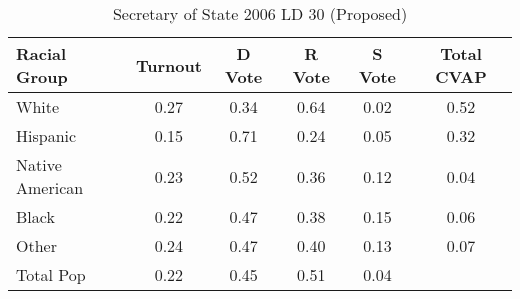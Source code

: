 \begin{table}[htb]
\begin{center}
\caption{Secretary of State 2006 LD 30 (Proposed)}
\label{sos06_cvap_ld_30}
\begin{tabular}{lccccc}
  \hline
Racial Group & Turnout & D Vote & R Vote & S Vote & Total CVAP \\ 
  \hline
White & 0.27 & 0.34 & 0.64 & 0.02 & 0.52 \\ 
  Hispanic & 0.15 & 0.71 & 0.24 & 0.05 & 0.32 \\ 
  Native American & 0.23 & 0.52 & 0.36 & 0.12 & 0.04 \\ 
  Black & 0.22 & 0.47 & 0.38 & 0.15 & 0.06 \\ 
  Other & 0.24 & 0.47 & 0.40 & 0.13 & 0.07 \\ 
  Total Pop & 0.22 & 0.45 & 0.51 & 0.04 &  \\ 
   \hline
\end{tabular}
\end{center}
\end{table}
